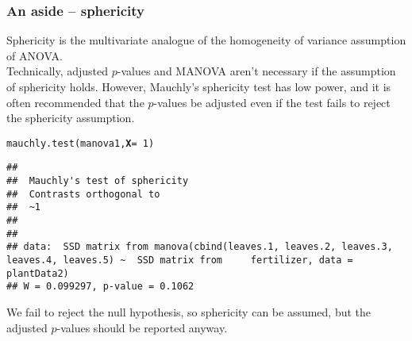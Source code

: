 \documentclass[color=usenames,dvipsnames]{beamer}\usepackage[]{graphicx}\usepackage[]{color}
\makeatletter
\newcommand{\hlnum}[1]{\textcolor[rgb]{0.69,0.494,0}{#1}}%
\newcommand{\hlopt}[1]{\textcolor[rgb]{0,0,0}{#1}}%
\newcommand{\hlstd}[1]{\textcolor[rgb]{0,0,0}{#1}}%
\newcommand{\hlkwc}[1]{\textcolor[rgb]{0,0,0}{\textbf{#1}}}%
\newcommand{\hlkwd}[1]{\textcolor[rgb]{0.004,0.004,0.506}{#1}}%
\newenvironment{kframe}{%
 \def\at@end@of@kframe{}%
 \ifinner\ifhmode%
  \def\at@end@of@kframe{\end{minipage}}%
  \begin{minipage}{\columnwidth}%
 \fi\fi%
 \def\FrameCommand##1{\hskip\@totalleftmargin \hskip-\fboxsep
 \colorbox{shadecolor}{##1}\hskip-\fboxsep
     \hskip-\linewidth \hskip-\@totalleftmargin \hskip\columnwidth}%
 \MakeFramed {\advance\hsize-\width
   \@totalleftmargin\z@ \linewidth\hsize
   \@setminipage}}%
 {\par\unskip\endMakeFramed%
 \at@end@of@kframe}
\newenvironment{knitrout}{}{} %
\makeatother
\begin{document}
\begin{frame}[fragile]
  \frametitle{An aside -- sphericity}
  \small
  Sphericity is the multivariate analogue of the homogeneity of
  variance assumption of ANOVA. \\
  \pause
  \vfill
  Technically, adjusted $p$-values and MANOVA aren't necessary if the
  assumption of sphericity holds. However, Mauchly's sphericity test
  has low power, and it is often recommended that the $p$-values be
  adjusted even if the test fails to reject the sphericity assumption.
  \pause
\begin{knitrout}\scriptsize
{}\color{fgcolor}\begin{kframe}
\begin{alltt}
\hlkwd{mauchly.test}\hlstd{(manova1,} \hlkwc{X}\hlstd{=}\hlopt{~}\hlnum{1}\hlstd{)}
\end{alltt}
\begin{verbatim}
## 
## 	Mauchly's test of sphericity
## 	Contrasts orthogonal to
## 	~1
## 
## 
## data:  SSD matrix from manova(cbind(leaves.1, leaves.2, leaves.3, leaves.4, leaves.5) ~  SSD matrix from     fertilizer, data = plantData2)
## W = 0.099297, p-value = 0.1062
\end{verbatim}
\end{kframe}
\end{knitrout}
\pause
\small %
{\centering We fail to reject the null hypothesis, so sphericity
  can be assumed, but the adjusted $p$-values should be reported anyway. \\}
\end{frame}
\end{document}
